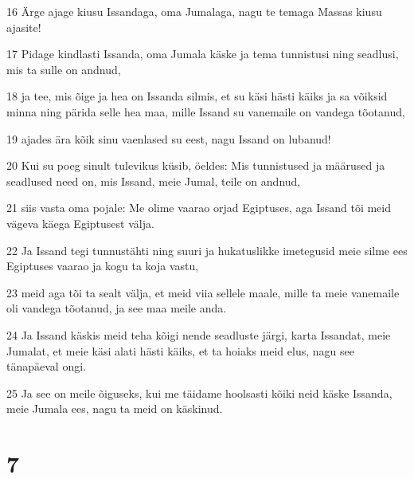 \par 16 Ärge ajage kiusu Issandaga, oma Jumalaga, nagu te temaga Massas kiusu ajasite!
\par 17 Pidage kindlasti Issanda, oma Jumala käske ja tema tunnistusi ning seadlusi, mis ta sulle on andnud,
\par 18 ja tee, mis õige ja hea on Issanda silmis, et su käsi hästi käiks ja sa võiksid minna ning pärida selle hea maa, mille Issand su vanemaile on vandega tõotanud,
\par 19 ajades ära kõik sinu vaenlased su eest, nagu Issand on lubanud!
\par 20 Kui su poeg sinult tulevikus küsib, öeldes: Mis tunnistused ja määrused ja seadlused need on, mis Issand, meie Jumal, teile on andnud,
\par 21 siis vasta oma pojale: Me olime vaarao orjad Egiptuses, aga Issand tõi meid vägeva käega Egiptusest välja.
\par 22 Ja Issand tegi tunnustähti ning suuri ja hukatuslikke imetegusid meie silme ees Egiptuses vaarao ja kogu ta koja vastu,
\par 23 meid aga tõi ta sealt välja, et meid viia sellele maale, mille ta meie vanemaile oli vandega tõotanud, ja see maa meile anda.
\par 24 Ja Issand käskis meid teha kõigi nende seadluste järgi, karta Issandat, meie Jumalat, et meie käsi alati hästi käiks, et ta hoiaks meid elus, nagu see tänapäeval ongi.
\par 25 Ja see on meile õiguseks, kui me täidame hoolsasti kõiki neid käske Issanda, meie Jumala ees, nagu ta meid on käskinud.

\chapter{7}

